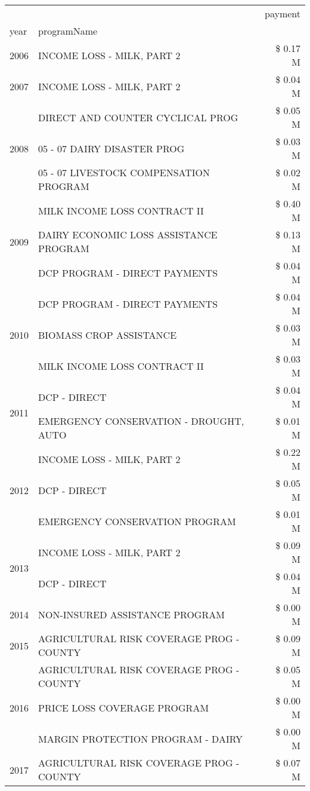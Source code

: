 \begin{tabular}{llr}
\toprule
 &  & payment \\
year & programName &  \\
\midrule
2006 & INCOME LOSS - MILK, PART 2 & \$ 0.17 M \\
\cline{1-3}
2007 & INCOME LOSS - MILK, PART 2 & \$ 0.04 M \\
\cline{1-3}
\multirow[t]{3}{*}{2008} & DIRECT AND COUNTER CYCLICAL PROG & \$ 0.05 M \\
 & 05 - 07 DAIRY DISASTER PROG & \$ 0.03 M \\
 & 05 - 07 LIVESTOCK COMPENSATION PROGRAM & \$ 0.02 M \\
\cline{1-3}
\multirow[t]{3}{*}{2009} & MILK INCOME LOSS CONTRACT II & \$ 0.40 M \\
 & DAIRY ECONOMIC LOSS ASSISTANCE PROGRAM & \$ 0.13 M \\
 & DCP PROGRAM - DIRECT PAYMENTS & \$ 0.04 M \\
\cline{1-3}
\multirow[t]{3}{*}{2010} & DCP PROGRAM - DIRECT PAYMENTS & \$ 0.04 M \\
 & BIOMASS CROP ASSISTANCE & \$ 0.03 M \\
 & MILK INCOME LOSS CONTRACT II & \$ 0.03 M \\
\cline{1-3}
\multirow[t]{2}{*}{2011} & DCP - DIRECT & \$ 0.04 M \\
 & EMERGENCY CONSERVATION - DROUGHT, AUTO & \$ 0.01 M \\
\cline{1-3}
\multirow[t]{3}{*}{2012} & INCOME LOSS - MILK, PART 2 & \$ 0.22 M \\
 & DCP - DIRECT & \$ 0.05 M \\
 & EMERGENCY CONSERVATION PROGRAM & \$ 0.01 M \\
\cline{1-3}
\multirow[t]{2}{*}{2013} & INCOME LOSS - MILK, PART 2 & \$ 0.09 M \\
 & DCP - DIRECT & \$ 0.04 M \\
\cline{1-3}
2014 & NON-INSURED ASSISTANCE PROGRAM & \$ 0.00 M \\
\cline{1-3}
2015 & AGRICULTURAL RISK COVERAGE PROG - COUNTY & \$ 0.09 M \\
\cline{1-3}
\multirow[t]{3}{*}{2016} & AGRICULTURAL RISK COVERAGE PROG - COUNTY & \$ 0.05 M \\
 & PRICE LOSS COVERAGE PROGRAM & \$ 0.00 M \\
 & MARGIN PROTECTION PROGRAM - DAIRY & \$ 0.00 M \\
\cline{1-3}
\multirow[t]{2}{*}{2017} & AGRICULTURAL RISK COVERAGE PROG - COUNTY & \$ 0.07 M \\

\end{tabular}
